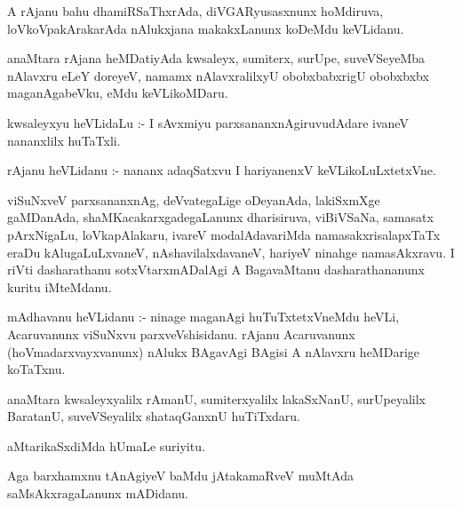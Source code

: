 \documentclass{article}
\begin{document}
\begin{mn}
A  rAjanu  bahu  dhamiRSaThxrAda,  diVGARyusasxnunx  hoMdiruva,  loVkoVpakArakarAda  nAlukxjana  makakxLanunx  koDeMdu  keVLidanu.
\end{mn}

\begin{mn}
anaMtara  rAjana  heMDatiyAda  kwsaleyx,  sumiterx,  surUpe,  suveVSeyeMba  nAlavxru  eLeY  doreyeV,  
namamx  nAlavxralilxyU  obobxbabxrigU  obobxbxbx  maganAgabeVku,  eMdu  keVLikoMDaru.
\end{mn}

\begin{mn}
kwsaleyxyu  heVLidaLu :- I  sAvxmiyu  parxsananxnAgiruvudAdare  ivaneV  nananxlilx  huTaTxli.
\end{mn}

\begin{mn}
rAjanu  heVLidanu :- nananx  adaqSatxvu  I  hariyanenxV  keVLikoLuLxtetxVne.
\end{mn}

\begin{mn}
viSuNxveV  parxsananxnAg,  deVvategaLige  oDeyanAda,  lakiSxmXge  gaMDanAda,  shaMKacakarxgadegaLanunx  
dharisiruva,  viBiVSaNa,  samasatx  pArxNigaLu,  loVkapAlakaru,  ivareV  modalAdavariMda  namasakxrisalapxTaTx  
eraDu  kAlugaLuLxvaneV,  nAshavilalxdavaneV,  hariyeV  ninahge  namasAkxravu.  I  riVti  dasharathanu  
sotxVtarxmADalAgi  A  BagavaMtanu  dasharathananunx  kuritu  iMteMdanu.
\end{mn}

\begin{mn}
mAdhavanu  heVLidanu :- ninage  maganAgi  huTuTxtetxVneMdu  heVLi,  Acaruvanunx  viSuNxvu  parxveVshisidanu.  
rAjanu  Acaruvanunx (hoVmadarxvayxvanunx) nAlukx  BAgavAgi  BAgisi  A  nAlavxru  heMDarige  koTaTxnu.
\end{mn}

\begin{mn}
anaMtara  kwsaleyxyalilx  rAmanU,  sumiterxyalilx  lakaSxNanU,  surUpeyalilx  BaratanU,  suveVSeyalilx  
shataqGanxnU  huTiTxdaru.
\end{mn}

\begin{mn}
aMtarikaSxdiMda  hUmaLe  suriyitu.
\end{mn}

\begin{mn}
Aga  barxhamxnu  tAnAgiyeV  baMdu  jAtakamaRveV  muMtAda  saMsAkxragaLanunx  mADidanu.
\end{mn}
\end{document}
